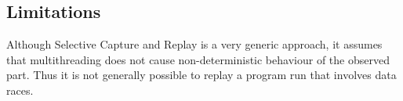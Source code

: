 \subsection{Limitations}
Although Selective Capture and Replay is a very generic approach, it assumes that multithreading does not cause non-deterministic behaviour of the observed part. Thus it is not generally possible to replay a program run that involves data races.

